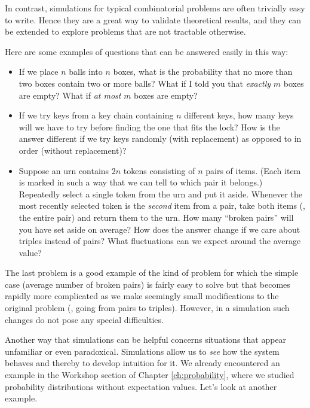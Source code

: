In contrast, simulations for typical combinatorial problems are often
trivially easy to write. Hence they are a great way to validate
theoretical results, and they can be extended to explore problems that
are not tractable otherwise.

Here are some examples of questions that can be answered easily in
this way:

\begin{itemize}
\item If we place $n$ balls into $n$ boxes, what is the probability
  that no more than two boxes contain two or more balls? What if I
  told you that \emph{exactly} $m$ boxes are empty? What if \emph{at
    most} $m$ boxes are empty?

\item If we try keys from a key chain containing $n$ different keys,
  how many keys will we have to try before finding the one that fits
  the lock? How is the answer different if we try keys randomly (with
  replacement) as opposed to in order (without replacement)?

\item Suppose an urn contains $2 n$ tokens consisting of $n$ pairs of
  items. (Each item is marked in such a way that we can tell to which
  pair it belongs.) Repeatedly select a single token from the urn and
  put it aside. Whenever the most recently selected token is the
  \emph{second} item from a pair, take both items (\ie, the entire
  pair) and return them to the urn. How many ``broken pairs'' will you
  have set aside on average? How does the answer change if we care
  about triples instead of pairs? What fluctuations can we expect
  around the average value?
\end{itemize}

The last problem is a good example of the kind of problem for which
the simple case (average number of broken pairs) is fairly easy to
solve but that becomes rapidly more complicated as we make seemingly
small modifications to the original problem (\eg, going from pairs to
triples). However, in a simulation such changes do not pose any
special difficulties.

Another way that simulations can be helpful concerns situations that
appear unfamiliar or even paradoxical. Simulations allow us to
\emph{see} how the system behaves and thereby to develop intuition for
it. We already encountered an example in the Workshop section of
Chapter \ref{ch:probability}, where we studied probability
distributions without expectation values. Let's look at another
example.

